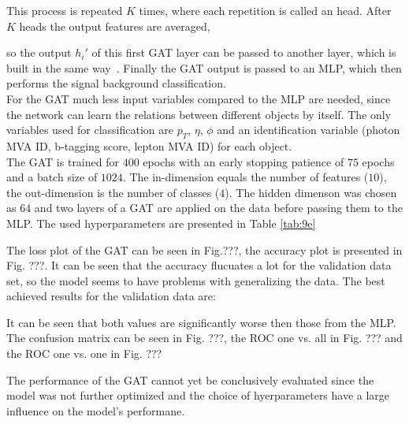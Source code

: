 
This process is repeated $K$ times, where each repetition is called an head. After $K$ heads the output features are averaged,


so the output $h_i'$ of this first GAT layer can be passed to another layer, which is built in the same way~\cite{GAT:2018}. Finally the GAT output is passed to an MLP, which then performs the signal background classification. \\

For the GAT much less input variables compared to the MLP are needed, since the network can learn the relations between different objects by itself. The only variables used for classification are
$p_T$, $\eta$, $\phi$ and an identification variable (photon MVA ID, b-tagging score, lepton MVA ID) for each object. \\

The GAT is trained for $400$ epochs with an early stopping patience of $75$ epochs and a batch size of $1024$. The in-dimension equals the number of features ($10$), the out-dimension is the number of classes ($4$).
The hidden dimenson was chosen as $64$ and two layers of a GAT are applied on the data before passing them to the MLP. The used hyperparameters are presented in Table \ref{tab:9e}


The loss plot of the GAT can be seen in Fig.???, the accuracy plot is presented in Fig. ???. It can be seen that the accuracy flucuates a lot for the validation data set, so the model seems to have problems
with generalizing the data. The best achieved results for the validation data are:


It can be seen that both values are significantly worse then those from the MLP. The confusion matrix can be seen in Fig. ???, the ROC one vs. all in Fig. ??? and the ROC one vs. one in Fig. ???

The performance of the GAT cannot yet be conclusively evaluated since the model was not further optimized and the choice of hyerparameters have a large influence on the model's performane.